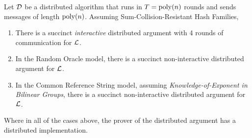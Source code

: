 \begin{theorem}
    Let $\mathcal{D}$ be a distributed algorithm that runs in $T = \operatorname{poly}(n)$ rounds and sends messages of length $\operatorname{poly}(n)$. Assuming Sum-Collision-Resistant Hash Families,
    \begin{enumerate}
        \item There is a succinct \emph{interactive} distributed argument with 4 rounds of communication for $\mathcal{L}$. 
        \item In the Random Oracle model, there is a succinct non-interactive distributed argument for $\mathcal{L}$.
        \item In the Common Reference String model, assuming \emph{Knowledge-of-Exponent in Bilinear Groups}, there is a succinct non-interactive distributed argument for $\mathcal{L}$. 
    \end{enumerate}
    Where in all of the cases above, the prover of the distributed argument has a distributed implementation.
\end{theorem}